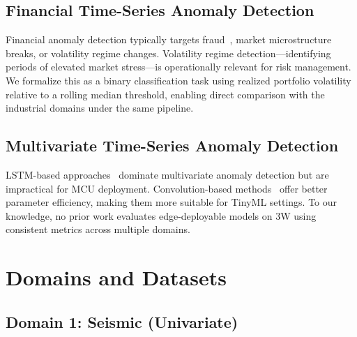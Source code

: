 \documentclass[conference]{IEEEtran}
\begin{document}
\subsection{Financial Time-Series Anomaly Detection}

Financial anomaly detection typically targets fraud~\cite{pang2021deep},
market microstructure breaks, or volatility regime changes.
Volatility regime detection---identifying periods of elevated market
stress---is operationally relevant for risk management.
We formalize this as a binary classification task using realized portfolio
volatility relative to a rolling median threshold, enabling direct
comparison with the industrial domains under the same pipeline.

\subsection{Multivariate Time-Series Anomaly Detection}

LSTM-based approaches~\cite{hundman2018detecting,su2019robust} dominate
multivariate anomaly detection but are impractical for MCU deployment.
Convolution-based methods~\cite{bai2018empirical} offer better parameter
efficiency, making them more suitable for TinyML settings.
To our knowledge, no prior work evaluates edge-deployable models on 3W
using consistent metrics across multiple domains.

\section{Domains and Datasets}
\label{sec:domains}

\subsection{Domain 1: Seismic (Univariate)}
\end{document}
